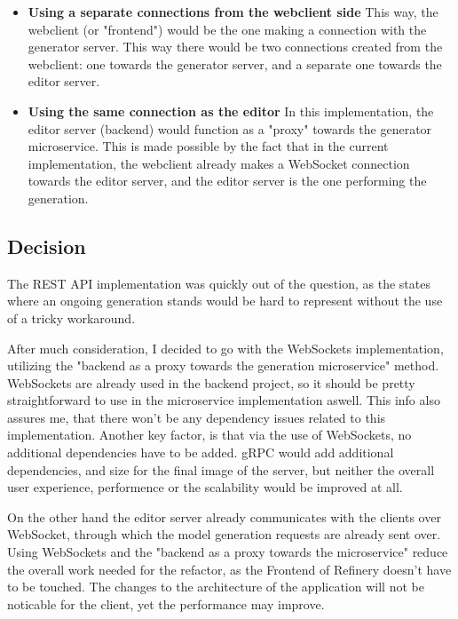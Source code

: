 	\begin{itemize}
			\item \textbf{Using a separate connections from the webclient side}
			This way, the webclient (or "frontend") would be the one making a connection with the generator server. This way
			there would be two connections created from the webclient: one towards the generator server, and a separate one 
			towards the editor server.

			\item \textbf{Using the same connection as the editor}
			In this implementation, the editor server (backend) would function as a "proxy" towards the generator microservice. This is made possible 
			by the fact that in the current implementation, the webclient already makes a WebSocket connection towards the editor server, and 
			the editor server is the one performing the generation.
	\end{itemize}

\subsection{Decision} \label{archdecision}
	The REST API implementation was quickly out of the question, as the states where an ongoing generation stands would be hard to represent
	 without the use of a tricky workaround.

	After much consideration, I decided to go with the WebSockets implementation, utilizing the "backend as a proxy towards the generation microservice" method.
	WebSockets are already used in the backend project, so it should be pretty straightforward to use in the microservice implementation aswell.
	This info also assures me, that there won't be any dependency issues related to this implementation. Another key factor, is that via the use of 
	WebSockets, no additional dependencies have to be added. gRPC would add additional dependencies, and size for the final image of the server,
	but neither the overall user experience, performence or the scalability would be improved at all.

	On the other hand the editor server already communicates with the clients over WebSocket, through which
	the model generation requests are already sent over. Using WebSockets and the "backend as a proxy towards the microservice" reduce the overall work needed for the refactor, 
	as the Frontend of Refinery 
	doesn't have to be touched. The changes to the architecture of the application will not be noticable for the client, yet the performance may improve.

